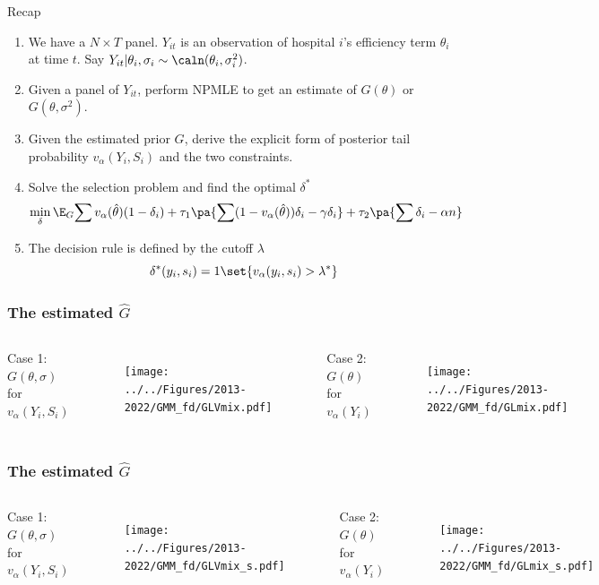 \documentclass[10pt,mathserif,aspectratio=169]{beamer}
\begin{document}
\begin{frame}{Recap}

  \begin{enumerate}
    \item We have a $N\times T$ panel. $Y_{it}$ is an observation of hospital $i$'s
          efficiency term $\theta_i$ at time $t$. Say $Y_{it}|\theta_i,\sigma_i \sim
            \caln(\theta_i,\sigma_i^2)$.
    \item Given a panel of $Y_{it}$, perform NPMLE to get an estimate of $G(\theta)$ or
          $G(\theta,\sigma^2)$.
    \item Given the estimated prior $G$, derive the explicit form of posterior tail
          probability $v_\alpha(Y_i,S_i)$ and the two constraints.
    \item Solve the selection problem and find the optimal $\delta^*$
          \begin{equation*}
            \min_{\delta}\E_G{\sum v_\alpha(\hat{\theta})(1-\delta_i) +\tau_1\pa{\sum (1-v_\alpha(\hat{\theta}))\delta_i -\gamma \delta_i} + \tau_2 \pa{\sum \delta_i -\alpha n}}
          \end{equation*}
    \item The decision rule is defined by the cutoff $\lambda$
          \[\delta^*(y_i,s_i)=1\set{v_\alpha(y_i,s_i)>\lambda^*}\]
  \end{enumerate}
\end{frame}

\begin{frame}
  \frametitle{The estimated $\hat{G}$}
  \begin{columns}[T,onlytextwidth]
    Case 1: $G(\theta,\sigma)$ for $v_\alpha(Y_i,S_i)$
    \begin{figure}
      \centering
      \texttt{[image: ../../Figures/2013-2022/GMM\_fd/GLVmix.pdf]}
    \end{figure}

    Case 2: $G(\theta)$ for $v_\alpha(Y_i)$
    \begin{figure}
      \centering
      \texttt{[image: ../../Figures/2013-2022/GMM\_fd/GLmix.pdf]}
    \end{figure}
  \end{columns}
\end{frame}

\begin{frame}
  \frametitle{The estimated $\hat{G}$}
  \begin{columns}[T,onlytextwidth]
    Case 1: $G(\theta,\sigma)$ for $v_\alpha(Y_i,S_i)$
    \begin{figure}
      \centering
      \texttt{[image: ../../Figures/2013-2022/GMM\_fd/GLVmix\_s.pdf]}
    \end{figure}

    Case 2: $G(\theta)$ for $v_\alpha(Y_i)$
    \begin{figure}
      \centering
      \texttt{[image: ../../Figures/2013-2022/GMM\_fd/GLmix\_s.pdf]}
    \end{figure}
  \end{columns}
\end{frame}
\end{document}
